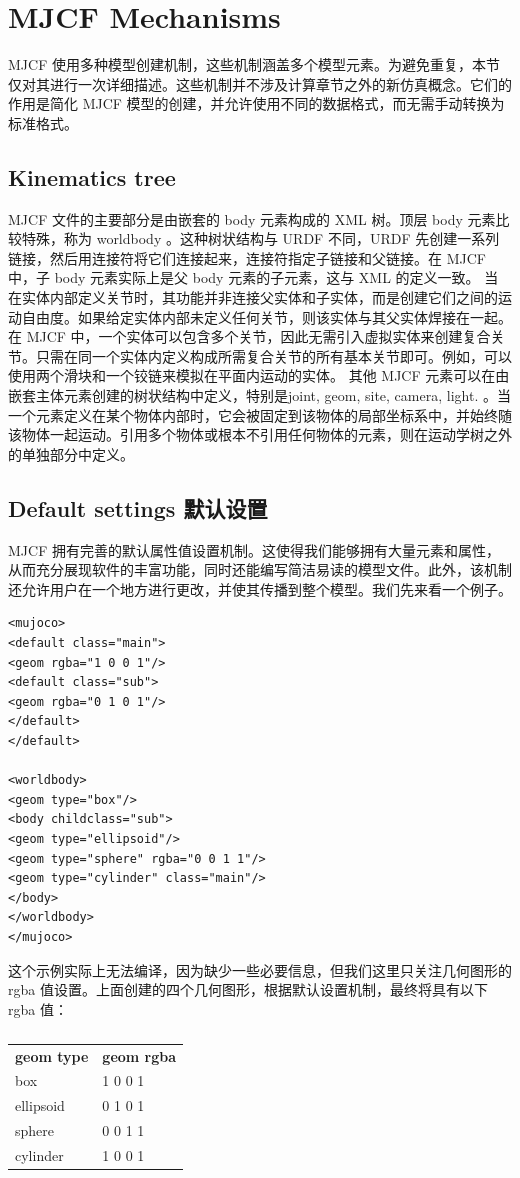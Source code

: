 \section{MJCF Mechanisms}
MJCF 使用多种模型创建机制，这些机制涵盖多个模型元素。为避免重复，本节仅对其进行一次详细描述。这些机制并不涉及计算章节之外的新仿真概念。它们的作用是简化 MJCF 模型的创建，并允许使用不同的数据格式，而无需手动转换为标准格式。

\subsection{Kinematics tree}
MJCF 文件的主要部分是由嵌套的 body 元素构成的 XML 树。顶层 body 元素比较特殊，称为 worldbody 。这种树状结构与 URDF 不同，URDF 先创建一系列链接，然后用连接符将它们连接起来，连接符指定子链接和父链接。在 MJCF 中，子 body 元素实际上是父 body 元素的子元素，这与 XML 的定义一致。
当在实体内部定义关节时，其功能并非连接父实体和子实体，而是创建它们之间的运动自由度。如果给定实体内部未定义任何关节，则该实体与其父实体焊接在一起。在 MJCF 中，一个实体可以包含多个关节，因此无需引入虚拟实体来创建复合关节。只需在同一个实体内定义构成所需复合关节的所有基本关节即可。例如，可以使用两个滑块和一个铰链来模拟在平面内运动的实体。
其他 MJCF 元素可以在由嵌套主体元素创建的树状结构中定义，特别是joint, geom, site, camera, light. 。当一个元素定义在某个物体内部时，它会被固定到该物体的局部坐标系中，并始终随该物体一起运动。引用多个物体或根本不引用任何物体的元素，则在运动学树之外的单独部分中定义。

\subsection{Default settings 默认设置}
MJCF 拥有完善的默认属性值设置机制。这使得我们能够拥有大量元素和属性，从而充分展现软件的丰富功能，同时还能编写简洁易读的模型文件。此外，该机制还允许用户在一个地方进行更改，并使其传播到整个模型。我们先来看一个例子。

\begin{lstlisting}
<mujoco>
<default class="main">
<geom rgba="1 0 0 1"/>
<default class="sub">
<geom rgba="0 1 0 1"/>
</default>
</default>

<worldbody>
<geom type="box"/>
<body childclass="sub">
<geom type="ellipsoid"/>
<geom type="sphere" rgba="0 0 1 1"/>
<geom type="cylinder" class="main"/>
</body>
</worldbody>
</mujoco>
\end{lstlisting}
这个示例实际上无法编译，因为缺少一些必要信息，但我们这里只关注几何图形的 rgba 值设置。上面创建的四个几何图形，根据默认设置机制，最终将具有以下 rgba 值：
\begin{table}[H]
	\centering
	\caption{}
	\begin{tabular}{ll}
		\textbf{geom type} & \textbf{geom rgba}  \\
		box                & 1 0 0 1             \\
		ellipsoid          & 0 1 0 1             \\
		sphere             & 0 0 1 1             \\
		cylinder~ ~        & 1 0 0 1            
	\end{tabular}
\end{table}

